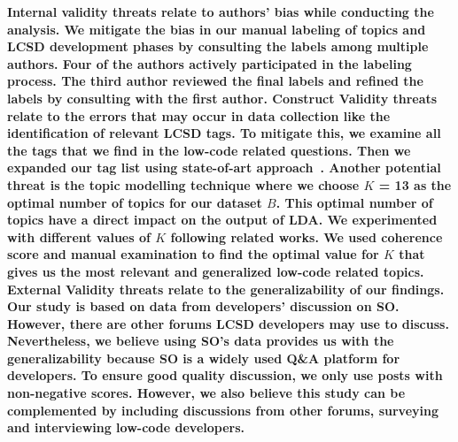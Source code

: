 
\bf{Internal validity} threats relate to authors'
bias while conducting the analysis. We mitigate the bias in
our manual labeling of topics and  LCSD development phases by consulting the labels among multiple authors. Four of the authors
actively participated in the labeling process. The third author reviewed the final labels and refined the labels by consulting with the first author. \bf{Construct Validity} threats 
relate to the errors that may occur in data collection like the identification of relevant  LCSD tags. To mitigate this, we examine all the tags that we find in the low-code related questions. Then we expanded our tag list using state-of-art approach~\cite{Bagherzadeh-BigdataTopic-FSE2019,abdellatif2020challenges,ahmed2018concurrency, rosen2016mobile}. Another potential threat is the topic modelling technique where we choose $K$ = 13 as the optimal number of topics for our dataset $B$. This optimal number of topics have a direct impact on the output of LDA. We experimented with different values of $K$ following related works\cite{chatbot, bagherzadeh2019going}. We used coherence score and manual examination to find the optimal value for $K$ that gives us the most relevant and generalized low-code related topics. \bf{External Validity} threats relate to the generalizability of our findings. Our study is based on data from developers' discussion on SO. However, there are other forums  LCSD developers may use to discuss. Nevertheless, we believe using SO's data provides us with the generalizability because SO is a widely used Q\&A platform for developers. To ensure good quality discussion, we only use posts with non-negative scores. However, we also believe this study can be complemented by including discussions from other forums, surveying and interviewing low-code developers.

